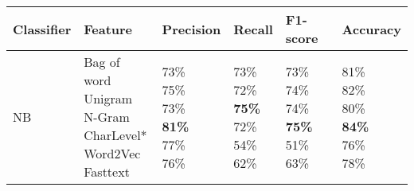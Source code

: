 \documentclass[11pt]{article}
\begin{document}
\begin{table*}[H]
\centering
\begin{tabular}{llllll}
\hline
\textbf{Classifier} & \textbf{Feature} & \textbf{Precision} & \textbf{Recall}& \textbf{F1-score} & \textbf{Accuracy} \\
\hline
NB & \makecell{Bag of word\\ Unigram\\ N-Gram\\CharLevel* \\ Word2Vec \\ Fasttext} & 
\makecell{73\% \\75\%\\ 73\%\\ \textbf{81\%} \\ 77\% \\76\%}& 
\makecell{73\% \\ 72\%\\ \textbf{75\%}\\ 72\%\\ 54\% \\ 62\%}&
\makecell{73\% \\ 74\%\\  74\%\\\textbf{75\%}\\ 51\% \\ 63\%}&
\makecell{81\% \\ 82\%\\   80\%\\\textbf{84\%}\\ 76\% \\ 78\%} \\

\hline


\end{tabular}
\end{table*}
\end{document}
